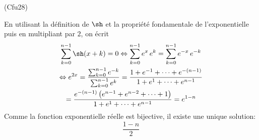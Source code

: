 \begin{tiny}(Cfu28)\end{tiny} En utilisant la définition de $\sh$ et la propriété fondamentale de l'exponentielle puis en multipliant par $2$, on écrit
\begin{multline*}
 \sum_{k=0}^{n-1}\sh(x+k) = 0
\Leftrightarrow
\sum_{k=0}^{n-1}e^x\,e^k = \sum_{k=0}^{n-1}e^{-x}\,e^{-k} \\
\Leftrightarrow
e^{2x} = \frac{\sum_{k=0}^{n-1}e^{-k}}{\sum_{k=0}^{n-1}e^{k}}
= \frac{1+e^{-1}+\cdots+e^{-(n-1)}}{1+e^{1}+\cdots+e^{n-1}}\\
= \frac{e^{-(n-1)}\left( e^{n-1} + e^{n-2} + \cdots + 1\right) }{1+e^{1}+\cdots+e^{n-1}}
= e^{1-n}
\end{multline*}
Comme la fonction exponentielle réelle est bijective, il existe une unique solution:
\begin{displaymath}
  \frac{1-n}{2}
\end{displaymath}
